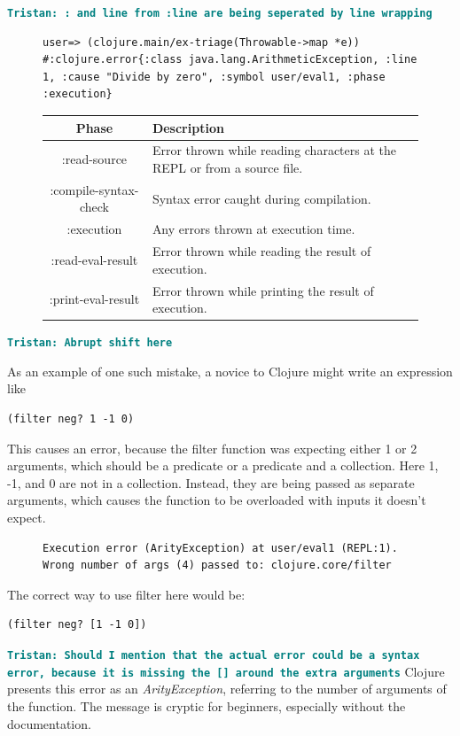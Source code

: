 \documentclass[12pt]{article}
\newcommand{\comment}[1]{{\bf \tt  {#1}}}
\newcommand{\tkcomment}[1]{\textcolor{Teal}{\comment{Tristan: {#1}}}}
\begin{document}
	\tkcomment{: and line from :line are being seperated by line wrapping}

	\begin{figure}[h]
		\centering
		\begin{lstlisting}[breaklines=true, basicstyle=\ttfamily]
user=> (clojure.main/ex-triage(Throwable->map *e))
#:clojure.error{:class java.lang.ArithmeticException, :line 1, :cause "Divide by zero", :symbol user/eval1, :phase :execution}
		\end{lstlisting}
	\end{figure}

	\begin{figure}[h]
		\centering
		\begin{tabular}{|c|l|}
			\hline
			\textbf{Phase} & \textbf{Description} \\
			\hline
			:read-source & Error thrown while reading characters at the REPL or from a source file. \\
			:compile-syntax-check & Syntax error caught during compilation. \\
			:execution & Any errors thrown at execution time. \\
			:read-eval-result & Error thrown while reading the result of execution. \\
			:print-eval-result & Error thrown while printing the result of execution. \\
			\hline
		\end{tabular}
	\end{figure}

\tkcomment{Abrupt shift here}

As an example of one such mistake, a novice to Clojure might write an expression like
\begin{verbatim}
(filter neg? 1 -1 0)
\end{verbatim}

This causes an error, because the filter function was expecting either 1 or 2 arguments,
 which should be a predicate or a predicate and a collection. Here 1, -1, and 0 are not in a collection. 
 Instead, they are being passed as separate arguments, which causes the function to be overloaded with inputs it doesn't expect.

 \begin{figure}[h]
	\centering
	\begin{lstlisting}[breaklines=true, basicstyle=\ttfamily]
Execution error (ArityException) at user/eval1 (REPL:1).
Wrong number of args (4) passed to: clojure.core/filter
	\end{lstlisting}
\end{figure}
The correct way to use filter here would be:
\begin{verbatim}
(filter neg? [1 -1 0])
\end{verbatim}
\tkcomment{Should I mention that the actual error could be a syntax error, because it is missing the [] around the extra arguments}
 Clojure presents this error as an {\it ArityException}, referring to the number of arguments of the function. 
 The message is cryptic for beginners, especially without the documentation.
\end{document}
